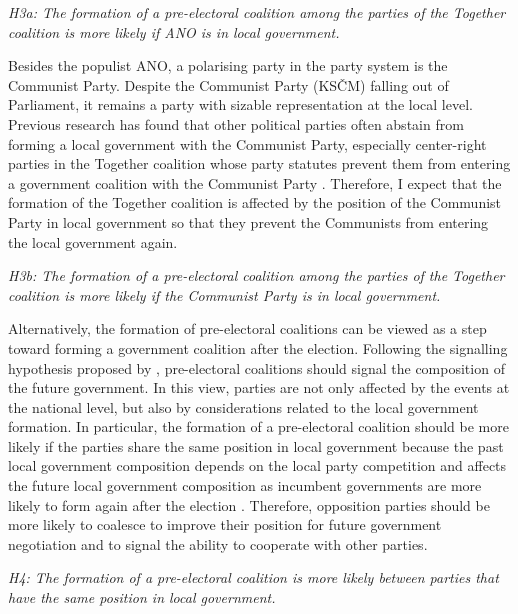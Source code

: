 \documentclass[]{interact}
\theoremstyle{plain}%
\theoremstyle{definition}
\theoremstyle{remark}
\begin{document}
\vspace{12pt}
\textit{H3a: The formation of a pre-electoral coalition among the parties of the Together coalition is more likely if ANO is in local government.\label{hyp:3.1}}
\vspace{12pt}

Besides the populist ANO, a polarising party in the party system is the Communist Party.
Despite the Communist Party (KSČM) falling out of Parliament, it remains a party with sizable representation at the local level. Previous research has found that other political parties often abstain from forming a local government with the Communist Party, especially center-right parties in the Together coalition whose party statutes prevent them from entering a government coalition with the Communist Party \citep{skvrnak2021}. Therefore, I expect that the formation of the Together coalition is affected by the position of the Communist Party in local government so that they prevent the Communists from entering the local government again.

\vspace{12pt}
\textit{H3b: The formation of a pre-electoral coalition among the parties of the Together coalition is more likely if the Communist Party is in local government.\label{hyp:3.2}}
\vspace{12pt}

Alternatively, the formation of pre-electoral coalitions can be viewed as a step toward forming a government coalition after the election. Following the signalling hypothesis proposed by \citet{golder2005}, pre-electoral coalitions should signal the composition of the future government. In this view, parties are not only affected by the events at the national level, but also by considerations related to the local government formation. 
In particular, the formation of a pre-electoral coalition should be more likely if the parties share the same position in local government because the past local government composition depends on the local party competition and affects the future local government composition as incumbent governments are more likely to form again after the election \citep{back2008}. Therefore, opposition parties should be more likely to coalesce to improve their position for future government negotiation and to signal the ability to cooperate with other parties. 

\textit{H4: The formation of a pre-electoral coalition is more likely between parties that have the same position in local government.\label{hyp:4.1}}
\end{document}
